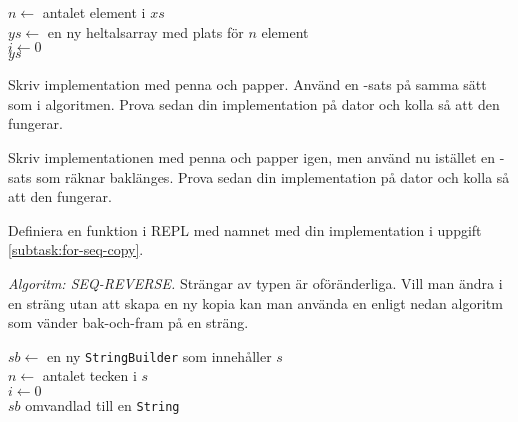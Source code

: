 \begin{algorithm}[H]
 
 $n \leftarrow$ antalet element i $xs$ \\
 $ys \leftarrow$ en ny heltalsarray med plats för $n$ element\\
 $i \leftarrow 0$  \\
 \Return $ys$
\end{algorithm}

\Subtask\Pen Skriv implementation med penna och papper. Använd en -sats på samma sätt som i algoritmen. Prova sedan din implementation på dator och kolla så att den fungerar.

\Subtask\Pen \label{subtask:for-seq-copy} Skriv implementationen med penna och papper igen, men använd nu istället en -sats som räknar baklänges. Prova sedan din implementation på dator och kolla så att den fungerar. 

\Subtask Definiera en funktion i REPL med namnet  med din implementation i uppgift \ref{subtask:for-seq-copy}.  


\Task \emph{Algoritm: SEQ-REVERSE.} Strängar av typen  är oföränderliga. Vill man ändra i en sträng utan att skapa en ny kopia kan man använda en  enligt nedan algoritm som vänder bak-och-fram på en sträng. 

\begin{algorithm}[H]
 
 $sb \leftarrow$ en ny \texttt{StringBuilder} som innehåller $s$ \\
 $n \leftarrow$ antalet tecken i $s$\\
 $i \leftarrow 0$  \\
 \Return $sb$ omvandlad till en \texttt{String}
\end{algorithm}

